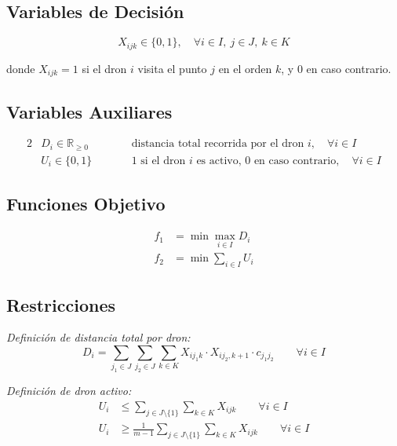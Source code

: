 \documentclass[11pt,a4paper]{article}
\begin{document}
\subsection*{Variables de Decisión}

\begin{equation}
    X_{ijk} \in \{0, 1\}, \quad \forall i \in I,\ j \in J,\ k \in K
\end{equation}

\noindent donde $X_{ijk} = 1$ si el dron $i$ visita el punto $j$ en el orden $k$, y $0$ en caso contrario.

\subsection*{Variables Auxiliares}

\begin{alignat}{2}
    &D_i \in \mathbb{R}_{\geq 0} \qquad && \text{distancia total recorrida por el dron } i,\quad \forall i \in I \\
    &U_i \in \{0, 1\}            \qquad && \text{1 si el dron } i \text{ es activo, 0 en caso contrario},\quad \forall i \in I
\end{alignat}

\subsection*{Funciones Objetivo}

\begin{align}
    f_1 &= \min_{} \max_{i \in I} D_i \\
    f_2 &= \min_{} \sum_{i \in I} U_i
\end{align}

\subsection*{Restricciones}

\noindent\textit{Definición de distancia total por dron:}
\begin{equation}
    D_i = \sum_{j_1 \in J} \sum_{j_2 \in J} \sum_{k \in K} X_{ij_1k} \cdot X_{ij_2,k+1} \cdot c_{j_1 j_2} \qquad \forall i \in I
\end{equation}

\noindent\textit{Definición de dron activo:}
\begin{align}
    U_i &\leq \sum_{j \in J \setminus \{1\}} \sum_{k \in K} X_{ijk} \qquad \forall i \in I \\
    U_i &\geq \frac{1}{m-1} \sum_{j \in J \setminus \{1\}} \sum_{k \in K} X_{ijk} \qquad \forall i \in I
\end{align}
\end{document}
